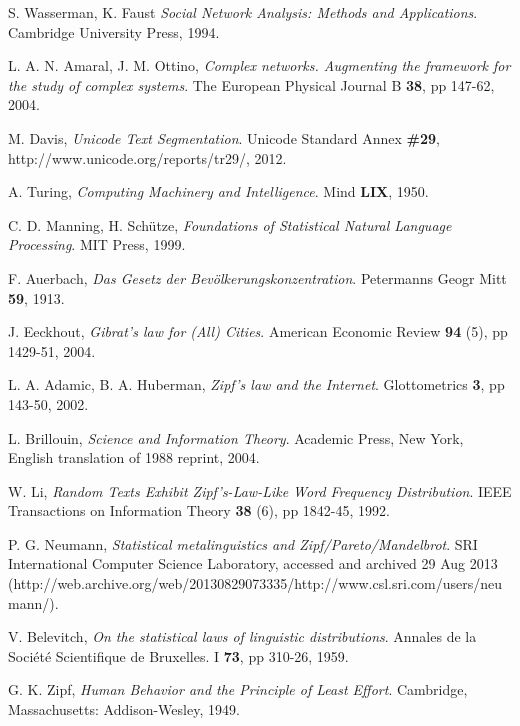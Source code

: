 \begin{thebibliography}{99}
  S. Wasserman, K. Faust
  \emph{Social Network Analysis: Methods and Applications}.
  Cambridge University Press,
  1994.

	L. A. N. Amaral, J. M. Ottino,
	\emph{Complex networks. Augmenting the framework for the study of complex systems}.
	The European Physical Journal B \textbf{38}, pp 147-62,
	2004.
	
  M. Davis,
  \emph{Unicode Text Segmentation}.
  Unicode Standard Annex \textbf{\#29}, http://www.unicode.org/reports/tr29/,
  2012.
  
  A. Turing,
  \emph{Computing Machinery and Intelligence}.
  Mind \textbf{LIX},
  1950.

  C. D. Manning, H. Schütze,
  \emph{Foundations of Statistical Natural Language Processing}.
  MIT Press,
  1999.

  F. Auerbach,
  \emph{Das Gesetz der Bevölkerungskonzentration}.
  Petermanns Geogr Mitt \textbf{59},
  1913.

  J. Eeckhout,
  \emph{Gibrat's law for (All) Cities}.
  American Economic Review \textbf{94} (5), pp 1429-51,
  2004.

  L. A. Adamic, B. A. Huberman,
  \emph{Zipf’s law and the Internet}.
  Glottometrics \textbf{3}, pp 143-50,
  2002.

  L. Brillouin,
  \emph{Science and Information Theory}.
  Academic Press, New York,
  English translation of 1988 reprint,
  2004.

  W. Li,
  \emph{Random Texts Exhibit Zipf's-Law-Like Word Frequency Distribution}.
  IEEE Transactions on Information Theory \textbf{38} (6), pp 1842-45,
  1992.

  P. G. Neumann,
  \emph{Statistical metalinguistics and Zipf/Pareto/Mandelbrot}.
  SRI International Computer Science Laboratory,
  accessed and archived 29 Aug 2013 (http://web.archive.org/web/20130829073335/http://www.csl.sri.com/users/neumann/).

  V. Belevitch,
  \emph{On the statistical laws of linguistic distributions}.
  Annales de la Société Scientifique de Bruxelles. I \textbf{73}, pp 310-26,
  1959.

  G. K. Zipf,
  \emph{Human Behavior and the Principle of Least Effort}.
  Cambridge, Massachusetts: Addison-Wesley,
  1949.


\end{thebibliography}
